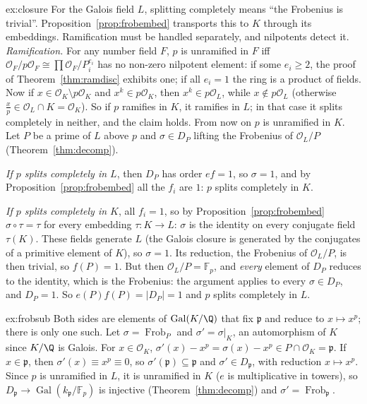 \begin{solution}{ex:closure}
\idea For the Galois field $L$, splitting completely means ``the Frobenius is trivial''. Proposition~\ref{prop:frobembed}
transports this to $K$ through its embeddings. Ramification must be handled separately, and nilpotents detect it.
\writeup \emph{Ramification.} For any number field $F$, $p$ is unramified in $F$ iff $\mathcal O_F/p\mathcal O_F\cong
\prod\mathcal O_F/P_i^{e_i}$ has no non-zero nilpotent element: if some $e_i\ge2$, the proof of Theorem~\ref{thm:ramdisc}
exhibits one; if all $e_i=1$ the ring is a product of fields. Now if $x\in\mathcal O_K\setminus p\mathcal O_K$ and $x^k\in
p\mathcal O_K$, then $x^k\in p\mathcal O_L$, while $x\notin p\mathcal O_L$ (otherwise $\frac xp\in\mathcal O_L\cap K=
\mathcal O_K$). So if $p$ ramifies in $K$, it ramifies in $L$; in that case it splits completely in neither, and the
claim holds. From now on $p$ is unramified in $K$. Let $P$ be a prime of $L$ above $p$ and $\sigma\in D_P$ lifting the
Frobenius of $\mathcal O_L/P$ (Theorem~\ref{thm:decomp}).

\emph{If $p$ splits completely in $L$}, then $D_P$ has order $ef=1$, so $\sigma=1$, and by
Proposition~\ref{prop:frobembed} all the $f_i$ are $1$: $p$ splits completely in $K$.

\emph{If $p$ splits completely in $K$}, all $f_i=1$, so by Proposition~\ref{prop:frobembed} $\sigma\circ\tau=\tau$ for
every embedding $\tau:K\to L$: $\sigma$ is the identity on every conjugate field $\tau(K)$. These fields generate $L$
(the Galois closure is generated by the conjugates of a primitive element of $K$), so $\sigma=1$. Its reduction, the
Frobenius of $\mathcal O_L/P$, is then trivial, so $f(P)=1$. But then $\mathcal O_L/P=\mathbb F_p$, and \emph{every}
element of $D_P$ reduces to the identity, which is the Frobenius: the argument applies to every $\sigma\in D_P$, and
$D_P=1$. So $e(P)f(P)=|D_P|=1$ and $p$ splits completely in $L$.
\end{solution}

\begin{solution}{ex:frobsub}
\idea Both sides are elements of $\operatorname{Gal}(K/\Q)$ that fix $\mathfrak p$ and reduce to $x\mapsto x^p$; there
is only one such.
\writeup Let $\sigma=\operatorname{Frob}_P$ and $\sigma'=\sigma|_K$, an automorphism of $K$ since $K/\Q$ is Galois. For
$x\in\mathcal O_K$, $\sigma'(x)-x^p=\sigma(x)-x^p\in P\cap\mathcal O_K=\mathfrak p$. If $x\in\mathfrak p$, then
$\sigma'(x)\equiv x^p\equiv0$, so $\sigma'(\mathfrak p)\subseteq\mathfrak p$ and $\sigma'\in D_{\mathfrak p}$, with
reduction $x\mapsto x^p$. Since $p$ is unramified in $L$, it is unramified in $K$ ($e$ is multiplicative in towers),
so $D_{\mathfrak p}\to\operatorname{Gal}(k_{\mathfrak p}/\mathbb F_p)$ is injective (Theorem~\ref{thm:decomp}) and
$\sigma'=\operatorname{Frob}_{\mathfrak p}$.
\end{solution}

